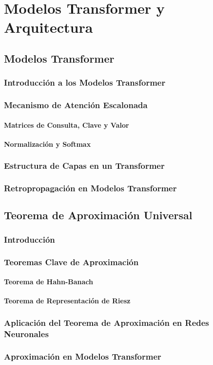 \chapter{Modelos Transformer y Arquitectura}

\section{Modelos Transformer}
\subsection{Introducción a los Modelos Transformer}


\subsection{Mecanismo de Atención Escalonada}
\subsubsection{Matrices de Consulta, Clave y Valor}
\subsubsection{Normalización y Softmax}
\subsection{Estructura de Capas en un Transformer}
\subsection{Retropropagación en Modelos Transformer}

\section{Teorema de Aproximación Universal}
\subsection{Introducción}
\subsection{Teoremas Clave de Aproximación}
\subsubsection{Teorema de Hahn-Banach}
\subsubsection{Teorema de Representación de Riesz}
\subsection{Aplicación del Teorema de Aproximación en Redes Neuronales}
\subsection{Aproximación en Modelos Transformer}
